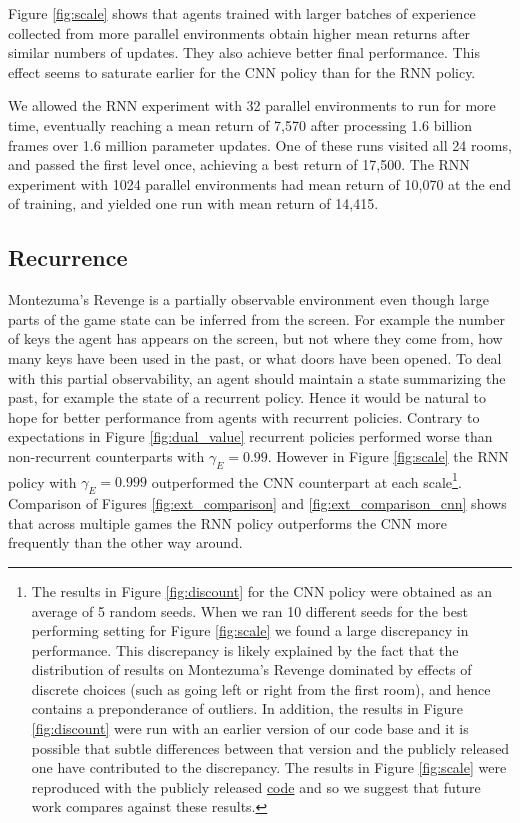 \documentclass{article} %
\begin{document}
Figure \ref{fig:scale} shows that agents trained with larger batches of experience collected from more parallel environments obtain higher mean returns after similar numbers of updates.  They also achieve better final performance. This effect seems to saturate earlier for the CNN policy than for the RNN policy.

We allowed the RNN experiment with 32 parallel environments to run for more time, eventually reaching a mean return of 7,570 after processing 1.6 billion frames over 1.6 million parameter updates. One of these runs visited all 24 rooms, and passed the first level once, achieving a best return of 17,500. The RNN experiment with 1024 parallel environments had mean return of 10,070 at the end of training, and yielded one run with mean return of 14,415.

\subsection{Recurrence}
\label{sec:cnnrnn}
Montezuma's Revenge is a partially observable environment even though large parts of the game state can be inferred from the screen. For example the number of keys the agent has appears on the screen, but not where they come from, how many keys have been used in the past, or what doors have been opened. To deal with this partial observability, an agent should maintain a state summarizing the past, for example the state of a recurrent policy. Hence it would be natural to hope for better performance from agents with recurrent policies. Contrary to expectations in Figure \ref{fig:dual_value} recurrent policies performed worse than non-recurrent counterparts with $\gamma_E=0.99$. However in Figure \ref{fig:scale} the RNN policy with $\gamma_E=0.999$ outperformed the CNN counterpart at each scale\footnote{The results in Figure \ref{fig:discount} for the CNN policy were obtained as an average of 5 random seeds. When we ran 10 different seeds for the best performing setting for Figure \ref{fig:scale} we found a large discrepancy in performance. This discrepancy is likely explained by the fact that the distribution of results on Montezuma's Revenge dominated by effects of discrete choices (such as going left or right from the first room), and hence contains a preponderance of outliers. In addition, the results in Figure \ref{fig:discount} were run with an earlier version of our code base and it is possible that subtle differences between that version and the publicly released one have contributed to the discrepancy. The results in Figure \ref{fig:scale} were reproduced with the publicly released \href{https://github.com/openai/random-network-distillation}{code} and so we suggest that future work compares against these results.}. Comparison of Figures \ref{fig:ext_comparison} and \ref{fig:ext_comparison_cnn} shows that across multiple games the RNN policy outperforms the CNN more frequently than the other way around.
\end{document}
